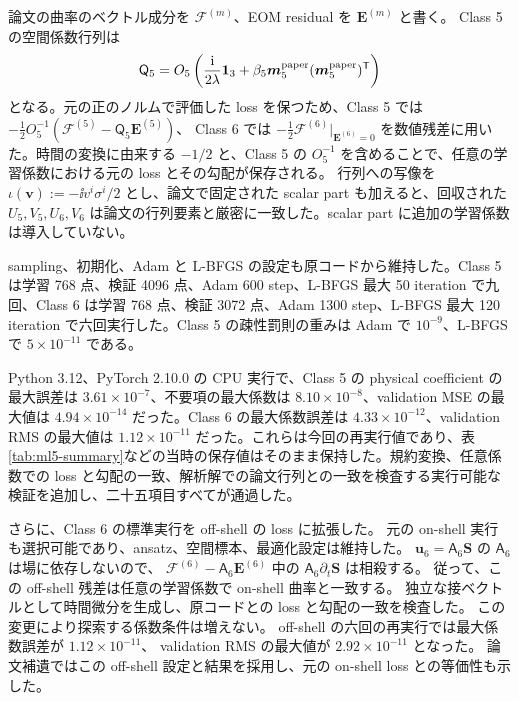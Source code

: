 論文の曲率のベクトル成分を $\boldsymbol{\mathcal F}^{(m)}$、EOM residual を $\boldsymbol E^{(m)}$ と書く。
Class 5 の空間係数行列は
\begin{equation}
\mathsf Q_5
=O_5\left(\frac{\mathrm i}{2\lambda}\mathbf 1_{3}
+\beta_5\boldsymbol m_5^{\rm paper}(\boldsymbol m_5^{\rm paper})^{\mathsf T}\right)
\end{equation}
となる。元の正のノルムで評価した loss を保つため、Class 5 では
$-\tfrac12O_5^{-1}(\boldsymbol{\mathcal F}^{(5)}-\mathsf Q_5\boldsymbol E^{(5)})$、
Class 6 では $-\tfrac12\boldsymbol{\mathcal F}^{(6)}|_{\boldsymbol E^{(6)}=0}$
を数値残差に用いた。時間の変換に由来する $-1/2$ と、Class 5 の $O_5^{-1}$ を含めることで、任意の学習係数における元の loss とその勾配が保存される。
行列への写像を $\iota(\boldsymbol v):=-\ii v^i\sigma^i/2$ とし、論文で固定された scalar part も加えると、回収された $U_5,V_5,U_6,V_6$ は論文の行列要素と厳密に一致した。scalar part に追加の学習係数は導入していない。

sampling、初期化、Adam と L-BFGS の設定も原コードから維持した。Class 5 は学習 768 点、検証 4096 点、Adam 600 step、L-BFGS 最大 50 iteration で九回、Class 6 は学習 768 点、検証 3072 点、Adam 1300 step、L-BFGS 最大 120 iteration で六回実行した。Class 5 の疎性罰則の重みは Adam で $10^{-9}$、L-BFGS で $5\times10^{-11}$ である。

Python 3.12、PyTorch 2.10.0 の CPU 実行で、Class 5 の physical coefficient の最大誤差は $3.61\times10^{-7}$、不要項の最大係数は $8.10\times10^{-8}$、validation MSE の最大値は $4.94\times10^{-14}$ だった。Class 6 の最大係数誤差は $4.33\times10^{-12}$、validation RMS の最大値は $1.12\times10^{-11}$ だった。これらは今回の再実行値であり、表\ref{tab:ml5-summary}などの当時の保存値はそのまま保持した。規約変換、任意係数での loss と勾配の一致、解析解での論文行列との一致を検査する実行可能な検証を追加し、二十五項目すべてが通過した。


さらに、Class 6 の標準実行を off-shell の loss に拡張した。
元の on-shell 実行も選択可能であり、ansatz、空間標本、最適化設定は維持した。
$\boldsymbol u_6=\mathsf A_6\boldsymbol S$ の $\mathsf A_6$ は場に依存しないので、
$\boldsymbol{\mathcal F}^{(6)}-\mathsf A_6\boldsymbol E^{(6)}$
中の $\mathsf A_6\partial_t\boldsymbol S$ は相殺する。
従って、この off-shell 残差は任意の学習係数で on-shell 曲率と一致する。
独立な接ベクトルとして時間微分を生成し、原コードとの loss と勾配の一致を検査した。
この変更により探索する係数条件は増えない。
off-shell の六回の再実行では最大係数誤差が $1.12\times10^{-11}$、
validation RMS の最大値が $2.92\times10^{-11}$ となった。
論文補遺ではこの off-shell 設定と結果を採用し、元の on-shell loss との等価性も示した。
